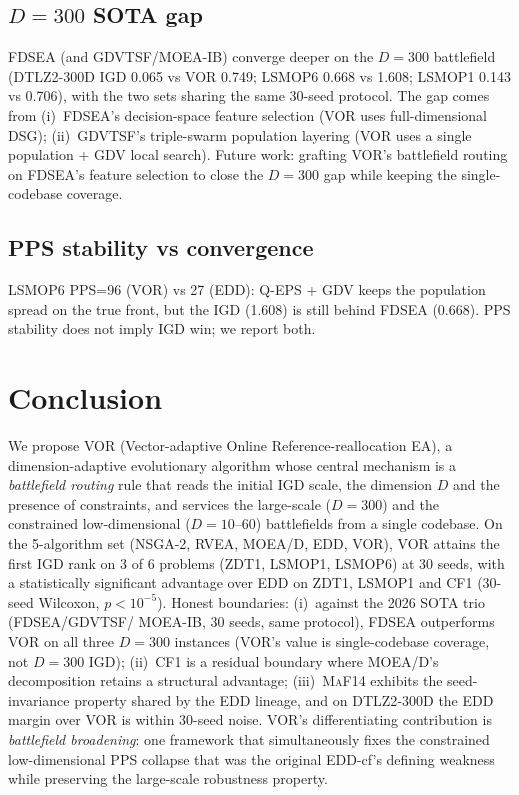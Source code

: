 \documentclass[preprint,12pt]{elsarticle}
\begin{document}
\subsection{$D=300$ SOTA gap}
\textsc{FDSEA} (and \textsc{GDVTSF}/\textsc{MOEA-IB}) converge deeper on the
$D=300$ battlefield (\textsc{DTLZ2}-300D IGD 0.065 vs VOR 0.749;
\textsc{LSMOP6} 0.668 vs 1.608; \textsc{LSMOP1} 0.143 vs 0.706), with the
two sets sharing the same 30-seed protocol. The gap comes from
(i)~\textsc{FDSEA}'s decision-space feature selection (VOR uses
full-dimensional \textsc{DSG});
(ii)~\textsc{GDVTSF}'s triple-swarm population layering (VOR uses a single
population + \textsc{GDV} local search). Future work: grafting VOR's
battlefield routing on \textsc{FDSEA}'s feature selection to close the
$D=300$ gap while keeping the single-codebase coverage.

\subsection{PPS stability vs convergence}
\textsc{LSMOP6} PPS=96 (VOR) vs 27 (EDD): \textsc{Q-EPS} +
\textsc{GDV} keeps the population spread on the true front, but the IGD
(1.608) is still behind \textsc{FDSEA} (0.668). \textsc{PPS} stability
does not imply \textsc{IGD} win; we report both.

\section{Conclusion}
\label{sec:conc}
We propose \textsc{VOR} (Vector-adaptive Online Reference-reallocation EA),
a dimension-adaptive evolutionary algorithm whose central mechanism is a
\emph{battlefield routing} rule that reads the initial IGD scale, the
dimension $D$ and the presence of constraints, and services the
large-scale ($D=300$) and the constrained low-dimensional ($D=10$--$60$)
battlefields from a single codebase. On the 5-algorithm set
(\textsc{NSGA-2}, \textsc{RVEA}, \textsc{MOEA/D}, \textsc{EDD},
\textsc{VOR}), VOR attains the first IGD rank on 3 of 6 problems
(\textsc{ZDT1}, \textsc{LSMOP1}, \textsc{LSMOP6}) at 30 seeds, with a
statistically significant advantage over \textsc{EDD} on \textsc{ZDT1},
\textsc{LSMOP1} and \textsc{CF1} (30-seed Wilcoxon, $p<10^{-5}$). Honest
boundaries: (i)~against the 2026 SOTA trio (\textsc{FDSEA}/\textsc{GDVTSF}/
\textsc{MOEA-IB}, 30 seeds, same protocol), \textsc{FDSEA} outperforms VOR
on all three $D=300$ instances (VOR's value is single-codebase coverage, not
$D=300$ IGD); (ii)~\textsc{CF1} is a residual boundary where MOEA/D's
decomposition retains a structural advantage; (iii)~\textsc{MaF14} exhibits
the seed-invariance property shared by the \textsc{EDD} lineage, and on
\textsc{DTLZ2}-300D the \textsc{EDD} margin over \textsc{VOR} is within
30-seed noise. VOR's differentiating contribution is \emph{battlefield
broadening}: one framework that simultaneously fixes the constrained
low-dimensional PPS collapse that was the original \textsc{EDD}-cf's
defining weakness while preserving the large-scale robustness property.
\end{document}
